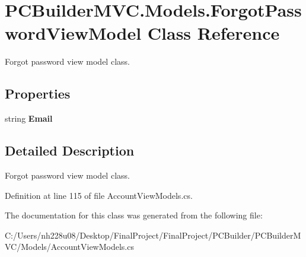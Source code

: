 \hypertarget{class_p_c_builder_m_v_c_1_1_models_1_1_forgot_password_view_model}{}\section{P\+C\+Builder\+M\+V\+C.\+Models.\+Forgot\+Password\+View\+Model Class Reference}
\label{class_p_c_builder_m_v_c_1_1_models_1_1_forgot_password_view_model}


Forgot password view model class.  


\subsection*{Properties}
\begin{DoxyCompactItemize}
\item 
string {\bfseries Email}\hypertarget{class_p_c_builder_m_v_c_1_1_models_1_1_forgot_password_view_model_a89b2c27d3ea7fc49e1edf10c801a09d4}{}\label{class_p_c_builder_m_v_c_1_1_models_1_1_forgot_password_view_model_a89b2c27d3ea7fc49e1edf10c801a09d4}

\end{DoxyCompactItemize}


\subsection{Detailed Description}
Forgot password view model class. 



Definition at line 115 of file Account\+View\+Models.\+cs.



The documentation for this class was generated from the following file\+:\begin{DoxyCompactItemize}
\item 
C\+:/\+Users/nh228u08/\+Desktop/\+Final\+Project/\+Final\+Project/\+P\+C\+Builder/\+P\+C\+Builder\+M\+V\+C/\+Models/Account\+View\+Models.\+cs\end{DoxyCompactItemize}
